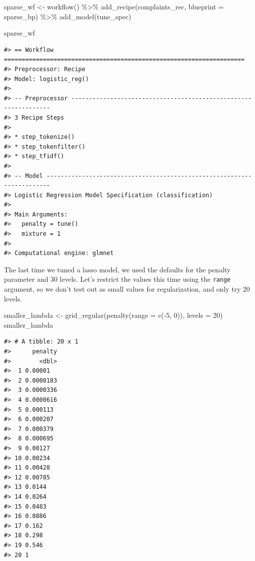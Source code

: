 \documentclass[
]{krantz}
\makeatletter
\newenvironment{Shaded}{\begin{snugshade}}{\end{snugshade}}
\newcommand{\AttributeTok}[1]{\textcolor[rgb]{0.77,0.63,0.00}{#1}}
\newcommand{\DecValTok}[1]{\textcolor[rgb]{0.00,0.00,0.81}{#1}}
\newcommand{\FunctionTok}[1]{\textcolor[rgb]{0.00,0.00,0.00}{#1}}
\newcommand{\NormalTok}[1]{#1}
\newcommand{\OtherTok}[1]{\textcolor[rgb]{0.56,0.35,0.01}{#1}}
\newcommand{\SpecialCharTok}[1]{\textcolor[rgb]{0.00,0.00,0.00}{#1}}
\newenvironment{kframe}{%
\medskip{}
\setlength{\fboxsep}{.8em}
 \def\at@end@of@kframe{}%
 \ifinner\ifhmode%
  \def\at@end@of@kframe{\end{minipage}}%
  \begin{minipage}{\columnwidth}%
 \fi\fi%
 \def\FrameCommand##1{\hskip\@totalleftmargin \hskip-\fboxsep
 \colorbox{shadecolor}{##1}\hskip-\fboxsep
     \hskip-\linewidth \hskip-\@totalleftmargin \hskip\columnwidth}%
 \MakeFramed {\advance\hsize-\width
   \@totalleftmargin\z@ \linewidth\hsize
   \@setminipage}}%
 {\par\unskip\endMakeFramed%
 \at@end@of@kframe}
\renewenvironment{Shaded}{\begin{kframe}}{\end{kframe}}
\makeatother
\begin{document}
\begin{Shaded}
\begin{Highlighting}[]
\NormalTok{sparse\_wf }\OtherTok{\textless{}{-}} \FunctionTok{workflow}\NormalTok{() }\SpecialCharTok{\%\textgreater{}\%}
  \FunctionTok{add\_recipe}\NormalTok{(complaints\_rec, }\AttributeTok{blueprint =}\NormalTok{ sparse\_bp) }\SpecialCharTok{\%\textgreater{}\%}
  \FunctionTok{add\_model}\NormalTok{(tune\_spec)}

\NormalTok{sparse\_wf}
\end{Highlighting}
\end{Shaded}

\begin{verbatim}
#> == Workflow ====================================================================
#> Preprocessor: Recipe
#> Model: logistic_reg()
#> 
#> -- Preprocessor ----------------------------------------------------------------
#> 3 Recipe Steps
#> 
#> * step_tokenize()
#> * step_tokenfilter()
#> * step_tfidf()
#> 
#> -- Model -----------------------------------------------------------------------
#> Logistic Regression Model Specification (classification)
#> 
#> Main Arguments:
#>   penalty = tune()
#>   mixture = 1
#> 
#> Computational engine: glmnet
\end{verbatim}

The last time we tuned a lasso model, we used the defaults for the penalty parameter and 30 levels. Let's restrict the values this time using the \texttt{range} argument, so we don't test out as small values for regularization, and only try 20 levels.

\begin{Shaded}
\begin{Highlighting}[]
\NormalTok{smaller\_lambda }\OtherTok{\textless{}{-}} \FunctionTok{grid\_regular}\NormalTok{(}\FunctionTok{penalty}\NormalTok{(}\AttributeTok{range =} \FunctionTok{c}\NormalTok{(}\SpecialCharTok{{-}}\DecValTok{5}\NormalTok{, }\DecValTok{0}\NormalTok{)), }\AttributeTok{levels =} \DecValTok{20}\NormalTok{)}
\NormalTok{smaller\_lambda}
\end{Highlighting}
\end{Shaded}

\begin{verbatim}
#> # A tibble: 20 x 1
#>      penalty
#>        <dbl>
#>  1 0.00001  
#>  2 0.0000183
#>  3 0.0000336
#>  4 0.0000616
#>  5 0.000113 
#>  6 0.000207 
#>  7 0.000379 
#>  8 0.000695 
#>  9 0.00127  
#> 10 0.00234  
#> 11 0.00428  
#> 12 0.00785  
#> 13 0.0144   
#> 14 0.0264   
#> 15 0.0483   
#> 16 0.0886   
#> 17 0.162    
#> 18 0.298    
#> 19 0.546    
#> 20 1
\end{verbatim}
\end{document}
